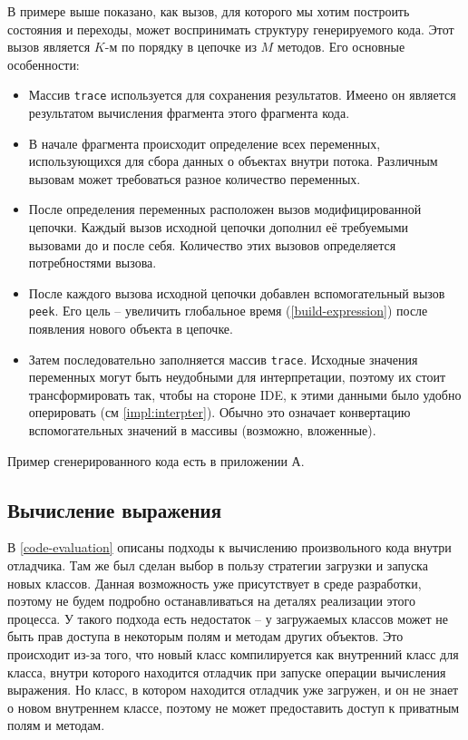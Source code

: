 В примере выше показано, как вызов, для которого мы хотим построить состояния и переходы, может воспринимать структуру генерируемого кода. Этот вызов является $K$-м по порядку в цепочке из $M$ методов. Его основные особенности:
\begin{itemize}
	\item Массив \texttt{trace} используется для сохранения результатов. Имеено он является результатом вычисления фрагмента этого фрагмента кода.
	\item В начале фрагмента происходит определение всех переменных, использующихся для сбора данных о объектах внутри потока. Различным вызовам может требоваться разное количество переменных.
	\item После определения переменных расположен вызов модифицированной цепочки. Каждый вызов исходной цепочки дополнил её требуемыми вызовами до и после себя. Количество этих вызовов определяется потребностями вызова.
	\item После каждого вызова исходной цепочки добавлен вспомогательный вызов \texttt{peek}. Его цель -- увеличить глобальное время (\ref{build-expression}) после появления нового объекта в цепочке. 
	\item Затем последовательно заполняется массив \texttt{trace}. Исходные значения переменных могут быть неудобными для интерпретации, поэтому их стоит трансформировать так, чтобы на стороне IDE, к этими данными было удобно оперировать (см \ref{impl:interpter}). Обычно это означает конвертацию вспомогательных значений в массивы (возможно, вложенные).
\end{itemize}

Пример сгенерированного кода есть в приложении А.

\subsection{Вычисление выражения}
В \ref{code-evaluation} описаны подходы к вычислению произвольного кода внутри отладчика. Там же был сделан выбор в пользу стратегии загрузки и запуска новых классов. Данная возможность уже присутствует в среде разработки, поэтому не будем подробно останавливаться на деталях реализации этого процесса. У такого подхода есть недостаток -- у загружаемых классов может не быть прав доступа в некоторым полям и методам других объектов. Это происходит из-за того, что новый класс компилируется как внутренний класс для класса, внутри которого находится отладчик при запуске операции вычисления выражения. Но класс, в котором находится отладчик уже загружен, и он не знает о новом внутреннем классе, поэтому не может предоставить доступ к приватным полям и методам.

